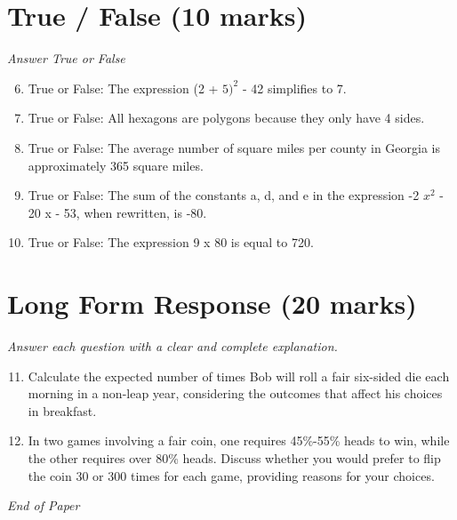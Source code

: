 \documentclass[12pt]{article}
\begin{document}
\section*{True / False (10 marks)}
\textit{Answer True or False}
\begin{enumerate}[label=\arabic*.]
\setcounter{enumi}{5}
\item True or False: The expression (2 + $5)^2$ - 42 simplifies to 7.
\item True or False: All hexagons are polygons because they only have 4 sides.
\item True or False: The average number of square miles per county in Georgia is approximately 365 square miles.
\item True or False: The sum of the constants a, d, and e in the expression -2 $x^2$ - 20 x - 53, when rewritten, is -80.
\item True or False: The expression 9 x 80 is equal to 720.
\end{enumerate}

\section*{Long Form Response (20 marks)}
\textit{Answer each question with a clear and complete explanation.}
\begin{enumerate}[label=\arabic*.]
\setcounter{enumi}{10}
\item Calculate the expected number of times Bob will roll a fair six-sided die each morning in a non-leap year, considering the outcomes that affect his choices in breakfast.
\item In two games involving a fair coin, one requires 45\%-55\% heads to win, while the other requires over 80\% heads. Discuss whether you would prefer to flip the coin 30 or 300 times for each game, providing reasons for your choices.
\end{enumerate}

\vfill
\noindent\textit{End of Paper}
\end{document}
